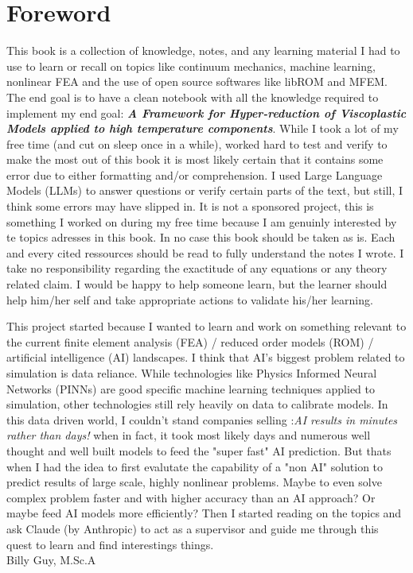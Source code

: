 \chapter{Foreword}
This book is a collection of knowledge, notes, and any learning material I had to use to learn or recall on topics like continuum mechanics, machine learning, nonlinear FEA and the use of open source softwares like libROM and MFEM. The end goal is to have a clean notebook with all the knowledge required to implement my end goal: \textbf{\textit{A Framework for Hyper-reduction of Viscoplastic Models applied to high temperature components}}. While I took a lot of my free time (and cut on sleep once in a while), worked hard to test and verify to make the most out of this book it is most likely certain that it contains some error due to either formatting and/or comprehension. I used Large Language Models (LLMs) to answer questions or verify certain parts of the text, but still, I think some errors may have slipped in. It is not a sponsored project, this is something I worked on during my free time because I am genuinly interested by te topics adresses in this book. In no case this book should be taken as is. Each and every cited ressources should be read to fully understand the notes I wrote. I take no responsibility regarding the exactitude of any equations or any theory related claim. I would be happy to help someone learn, but the learner should help him/her self and take appropriate actions to validate his/her learning. 

 This project started because I wanted to learn and work on something relevant to the current finite element analysis (FEA) / reduced order models (ROM) / artificial intelligence (AI) landscapes. I think that AI's biggest problem related to simulation is data reliance. While technologies like Physics Informed Neural Networks (PINNs) are good specific machine learning techniques applied to simulation, other technologies still rely heavily on data to calibrate models. In this data driven world, I couldn't stand companies selling :\textit{AI results in minutes rather than days!} when in fact, it took most likely days and numerous well thought and well built models to feed the "super fast" AI prediction. But thats when I had the idea to first evalutate the capability of a "non AI" solution to predict results of large scale, highly nonlinear problems. Maybe to even solve complex problem faster and with higher accuracy than an AI approach? Or maybe feed AI models more efficiently?  Then I started reading on the topics and ask Claude (by Anthropic) to act as a supervisor and guide me through this quest to learn and find interestings things.
\\

\noindent
Billy Guy, M.Sc.A